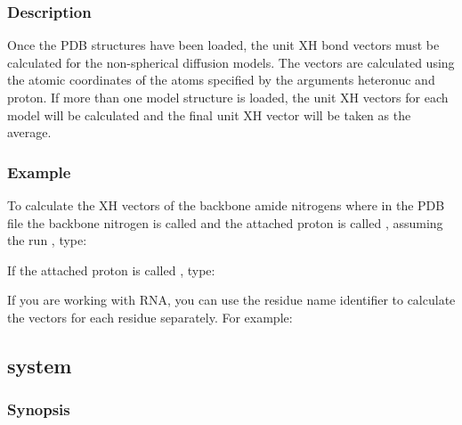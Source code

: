   

  
 \subsubsection{Description} 

 Once the PDB structures have been loaded, the unit XH bond vectors must be calculated for the non-spherical diffusion models.  The vectors are calculated using the atomic coordinates of the atoms specified by the arguments heteronuc and proton.  If more than one model structure is loaded, the unit XH vectors for each model will be calculated and the final unit XH vector will be taken as the average. 
  

  
 \subsubsection{Example} 

 To calculate the XH vectors of the backbone amide nitrogens where in the PDB file the backbone nitrogen is called  and the attached proton is called , assuming the run , type: 
  





 If the attached proton is called , type: 
  


 If you are working with RNA, you can use the residue name identifier to calculate the vectors for each residue separately.  For example: 
  



  

 \newpage 

 \subsection{system} 

  
 \subsubsection{Synopsis} 

